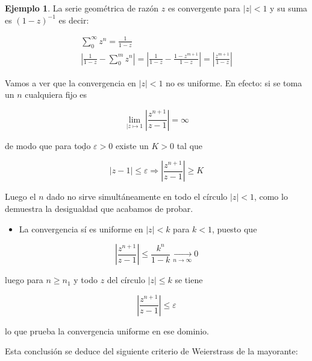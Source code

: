 \documentclass[10pt]{article}
\theoremstyle{plain}
\theoremstyle{definition}
\newtheorem{example}[theorem]{Ejemplo}
\theoremstyle{remark}
\begin{document}
\begin{example}
La serie geométrica de razón $z$ es convergente para $|z|<1$ y su suma es $(1-z)^{-1}$ es decir:

$$
\begin{gathered}
\sum_{0}^{\infty} z^{n}=\frac{1}{1-z} \\
\left|\frac{1}{1-z}-\sum_{0}^{m} z^{n}\right|=\left|\frac{1}{1-z}-\frac{1-z^{m+1}}{1-z}\right|=\left|\frac{z^{m+1}}{1-z}\right|
\end{gathered}
$$

Vamos a ver que la convergencia en $|z|<1$ no es uniforme. En efecto: si se toma un $n$ cualquiera fijo es

$$
\lim _{\mid z \mapsto 1}\left|\frac{z^{n+1}}{z-1}\right|=\infty
$$

de modo que para toḍo $\varepsilon>0$ existe un $K>0$ tal que

$$
|z-1| \leqslant \varepsilon \Rightarrow\left|\frac{z^{n+1}}{z-1}\right| \geqslant K
$$

Luego el $n$ dado no sirve simultáneamente en todo el círculo $|z|<1$, como lo demuestra la desigualdad que acabamos de probar.

\begin{itemize}
  \item La convergencia sí es uniforme en $|z|<k$ para $k<1$, puesto que
\end{itemize}

$$
\left|\frac{z^{n+1}}{z-1}\right| \leqslant \frac{k^{n}}{1-k} \xrightarrow[n \rightarrow \infty]{ } 0
$$

luego para $n \geqslant n_{1}$ y todo $z$ del círculo $|z| \leqslant k$ se tiene

$$
\left|\frac{z^{n+1}}{z-1}\right| \leqslant \varepsilon
$$

lo que prueba la convergencia uniforme en ese dominio.
\end{example}


Esta conclusión se deduce del siguiente criterio de Weierstrass de la mayorante:
\end{document}
